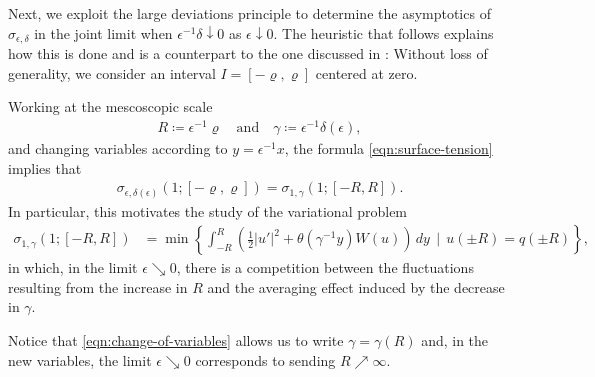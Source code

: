 \documentclass[10pt,a4paper]{amsart}
\begin{document}
Next, we exploit the large deviations principle to determine the asymptotics of $\sigma_{\epsilon,\delta}$ in the joint limit when $\epsilon^{-1} \delta \downarrow 0$ as $\epsilon \downarrow 0$.  The heuristic that follows explains how this is done and is a counterpart to the one discussed in \cite[Sections 3.5 \& 4.3]{part1}: Without loss of generality, we consider an interval $I = [-\varrho,\varrho]$ centered at zero.

Working at the mescoscopic scale 
\begin{align}\label{eqn:change-of-variables}
	R \coloneqq \epsilon^{ -1 } \varrho
	\quad \text{and} \quad
	\gamma \coloneqq \epsilon^{ - 1 } \delta(\epsilon) ,
\end{align}
and changing variables according to $y = \epsilon^{-1} x$, the formula \eqref{eqn:surface-tension} implies that 
	\begin{align*}
			\sigma_{\epsilon,\delta(\epsilon)}(1; [-\varrho,\varrho] ) = \sigma_{1,\gamma}(1;[-R,R]) .
	\end{align*}
In particular, this motivates the study of the variational problem
	\begin{align*}
		\sigma_{1,\gamma}(1;[-R,R]) &= \min \left\{ \int_{-R}^{R} \left( \frac{1}{2} |u'|^{2} + \theta(\gamma^{-1} y) W(u) \right) \, dy \, \mid \, u(\pm R) = q(\pm R) \right\} ,
	\end{align*}
in which, in the limit $\epsilon \searrow 0$, there is a competition between the fluctuations resulting from the increase in $R$ and the averaging effect induced by the decrease in $\gamma$.

Notice that \eqref{eqn:change-of-variables} allows us to write $\gamma = \gamma(R)$ and, in the new variables, the limit $\epsilon \searrow 0$ corresponds to sending $R \nearrow \infty$.
	
\end{document}
